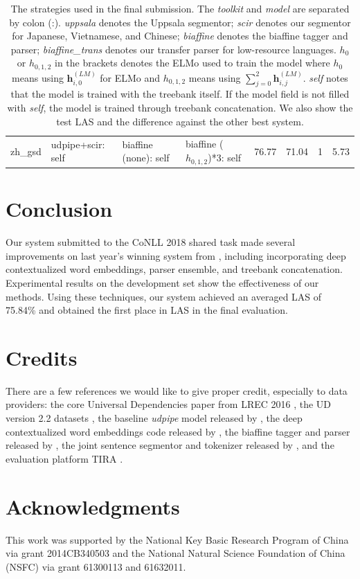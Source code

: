 \documentclass[11pt,a4paper]{article}
\begin{document}
\begin{table}[t]
\begin{tabular}{rlllcccc}
zh\_gsd & udpipe+scir: self & biaffine (none): self & biaffine ($h_{0,1,2}$)*3: self & 76.77 & 71.04 & 1 & 5.73 \\
\end{tabular}
\caption{The strategies used in the final submission. 
	The \textit{toolkit} and \textit{model} are separated by colon (:).
	\textit{uppsala} denotes the Uppsala segmentor; \textit{scir} denotes our segmentor for Japanese, Vietnamese, and Chinese;
	\textit{biaffine} denotes the biaffine tagger and parser;
	\textit{biaffine\_trans} denotes our transfer parser for low-resource languages.
	$h_{0}$ or $h_{0,1,2}$ in the brackets denotes the ELMo used to train the model where $h_0$
	means using $\mathbf{h}_{i, 0}^{(LM)}$ for ELMo and $h_{0,1,2}$ means using $\sum_{j=0}^{2} \mathbf{h}_{i, j}^{(LM)}$.
	\textit{self} notes that the model is trained with the treebank itself.
	If the model field is not filled with \textit{self}, the model is trained through treebank concatenation.
	We also show the test LAS and the difference against the other best system.
}
\end{table}

\section{Conclusion}

Our system submitted to the CoNLL 2018 shared task made several improvements
on last year's winning system from \citet{dozat-qi-manning:2017:K17-3},
including incorporating deep contextualized word embeddings,
parser ensemble, and treebank concatenation.
Experimental results on the development set show the effectiveness of our methods.
Using  these techniques, our system achieved an averaged LAS of 75.84\%
and obtained the first place in LAS in the final evaluation.

\section{Credits}

There are a few references we would like to
give proper credit, especially to data providers:
the core Universal Dependencies paper from LREC 2016 \cite{ud},
the UD version 2.2 datasets \cite{ud22testdata}, 
the baseline \textit{udpipe} model released by \citet{udpipe},
the deep contextualized word embeddings code released by \citet{N18-1202},
the biaffine tagger and parser released by \citet{dozat-qi-manning:2017:K17-3},
the joint sentence segmentor and tokenizer released by \citet{delhoneux-EtAl:2017:K17-3},
and the evaluation platform TIRA \cite{tira}.

\section*{Acknowledgments}
This work was supported by the National Key Basic Research Program of China
via grant 2014CB340503 and the National Natural Science Foundation of China (NSFC)
via grant 61300113 and 61632011.



\end{document}
